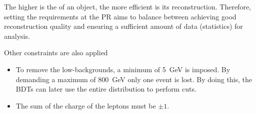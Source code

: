 \begin{comment}
\end{comment}

The higher is the \pT of an object, the more efficient is its reconstruction. Therefore,
setting the \pT requirements at the PR aims to balance between achieving
good reconstruction quality and ensuring a sufficient amount of data (statistics) for analysis.

Other constraints are also applied
\begin{itemize}
	\item To remove the low-\MET backgrounds, a minimum \MET of 5~GeV is imposed.
	By demanding a maximum \MET of 800~GeV only one event is lost. By doing this, the BDTs can
	later use the entire \MET distribution to perform cuts. 
	\item The sum of the charge of the leptons must be $\pm1$.
\end{itemize}

